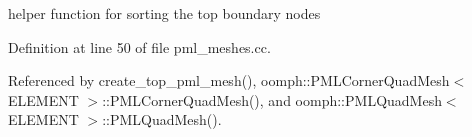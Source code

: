 helper function for sorting the top boundary nodes 



Definition at line 50 of file pml\+\_\+meshes.\+cc.



Referenced by create\+\_\+top\+\_\+pml\+\_\+mesh(), oomph\+::\+P\+M\+L\+Corner\+Quad\+Mesh$<$ E\+L\+E\+M\+E\+N\+T $>$\+::\+P\+M\+L\+Corner\+Quad\+Mesh(), and oomph\+::\+P\+M\+L\+Quad\+Mesh$<$ E\+L\+E\+M\+E\+N\+T $>$\+::\+P\+M\+L\+Quad\+Mesh().

